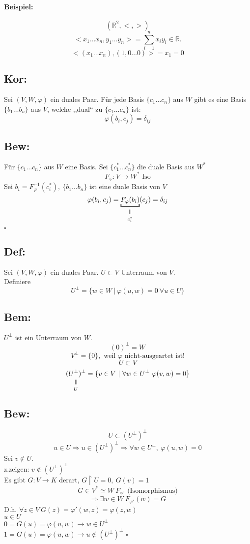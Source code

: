 \documentclass[titlepage,12pt,a4paper,ngerman]{report}
\newenvironment{bew}[1]{\subsection{Bew: #1}}{\hfill$\square$}
\newcommand{\Bew}[2]{\begin{bew}{#1}#2\end{bew}}
\newcommand{\verteq}{\rotatebox{90}{$\,=$}}
\newcommand{\equalto}[2]{\underset{\scriptstyle\overset{\mkern4mu\verteq}{#2}}{#1}}
\newcommand{\tx}[1]{\textrm{#1}}
\begin{document}
\paragraph{Beispiel:}
$$(\mathbb R^2, <, > )$$
$$<x_1 \dots x_n, y_1 \dots y_n> = \sum_{i=1}^n x_i y_i \in \mathbb R.$$
$$<(x_1 \dots x_n), (1, 0 \dots 0)> = x_1 = 0$$

\subsection{Kor:}
Sei $(V,W,\varphi)$ ein duales Paar. Für jede Basis $\{c_1 \dots c_n\}$ aus $W$ gibt es eine Basis $\{b_1 \dots b_n\}$ aus $V$, welche ,,dual`` zu $\{c_1 \dots c_n\}$ ist:
$$\varphi(b_i, c_j) = \delta_{ij}$$

\Bew{}{
	Für $\{c_1 \dots c_n\}$ aus $W$ eine Basis.
	Sei $\{c_1^* \dots c_n^*\}$ die duale Basis aus $W^*$
	$$F_\varphi: V \to W^* \tx{ Iso}$$
	Sei $b_i = F_\varphi^{-1}(c_i^*),\ \{b_1 \dots b_n\}$ ist eine duale Basis von $V$
	$$\varphi(b_i, c_j) = \equalto{\underbracket{F_\varphi(b_i)}}{c_i^*}(c_j) = \delta_{ij}$$
}

\subsection{Def:}
Sei $(V,W,\varphi)$ ein duales Paar. $U \subset V$ Unterraum von $V$.\\
Definiere $$U^\perp = \{w \in W \ |\  \varphi (u,w) = 0\ \forall u \in U \}$$
\subsection*{Bem:}
$U^\perp$ ist ein Unterraum von $W$.
$$(0)^\perp = W$$
$$V^\perp = \{0\}, \tx{ weil $\varphi$ nicht-ausgeartet ist!}$$
$$U \subset V$$
$$\equalto{(U^\perp)^\perp}{U} = \{v \in V \ | \  \forall w \in U^\perp\ \varphi(v,w) = 0 \}$$
\Bew{}{
	$$U\subset (U^\perp)^\perp$$
	$$u \in U \Rightarrow  u \in (U^\perp)^\perp \Rightarrow \forall w \in U^\perp,\ \varphi(u,w) = 0$$
	Sei $v \notin U.$\\
	z.zeigen: $v \notin (U^\perp)^\perp$\\
	Es gibt $G: V \to K$ derart, $G\upharpoonright U = 0,\ G(v) = 1$
	$$G \in V^* \simeq W\ F_{\varphi'} \tx{ (Isomorphismus)}$$
	$$\Rightarrow \exists w \in W\ F_{\varphi'}(w) = G$$
	D.h. $\forall z \in V\ G (z) = \varphi' (w,z) = \varphi(z,w)$\\
	$u \in U$\\
	$ 0 = G(u) = \varphi(u,w) \rightarrow w \in U^\perp $\\
	$ 1 = G(u) = \varphi(u,w) \rightarrow u \notin (U^\perp)^\perp $
}
\end{document}
